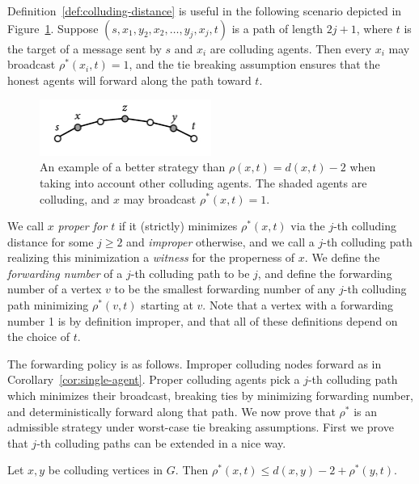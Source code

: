 \documentclass[prodmode,acmec]{ec-acmsmall}
\begin{document}
Definition~\ref{def:colluding-distance} is useful in the following scenario
depicted in Figure~\ref{fig:colluding-distance}. Suppose $(s, x_1, y_2, x_2,
\dots, y_j, x_j, t)$ is a path of length $2j + 1$, where $t$ is the target of a
message sent by $s$ and $x_i$ are colluding agents.  Then every $x_i$ may
broadcast $\rho^*(x_i, t) = 1$, and the tie breaking assumption ensures that
the honest agents will forward along the path toward $t$.

\begin{figure}[thb]
\centering
\includegraphics[width=0.5\textwidth]{images/colluding-distance.pdf}
\caption{An example of a better strategy than $\rho(x,t) = d(x,t) - 2$ when
taking into account other colluding agents. The shaded agents are colluding,
and $x$ may broadcast $\rho^*(x,t) = 1$.}
\label{fig:colluding-distance}
\end{figure}

We call $x$ \emph{proper for $t$} if it (strictly) minimizes $\rho^*(x,t)$ via
the $j$-th colluding distance for some $j \geq 2$ and \emph{improper}
otherwise, and we call a $j$-th colluding path realizing this minimization a
\emph{witness} for the properness of $x$. We define the \emph{forwarding
number} of a $j$-th colluding path to be $j$, and define the forwarding number
of a vertex $v$ to be the smallest forwarding number of any $j$-th colluding
path minimizing $\rho^*(v,t)$ starting at $v$. Note that a vertex with a
forwarding number 1 is by definition improper, and that all of these
definitions depend on the choice of $t$.

The forwarding policy is as follows. Improper colluding nodes forward as in
Corollary~\ref{cor:single-agent}. Proper colluding agents pick a $j$-th
colluding path which minimizes their broadcast, breaking ties by minimizing
forwarding number, and deterministically forward along that path. We now prove
that $\rho^*$ is an admissible strategy under worst-case tie breaking
assumptions. First we prove that $j$-th colluding paths can be extended in a
nice way.

\begin{proposition} \label{prop:inductive-path}

Let $x,y$ be colluding vertices in $G$. Then $\rho^*(x,t) \leq d(x,y) - 2 +
\rho^*(y,t)$.

\end{proposition}
\end{document}
